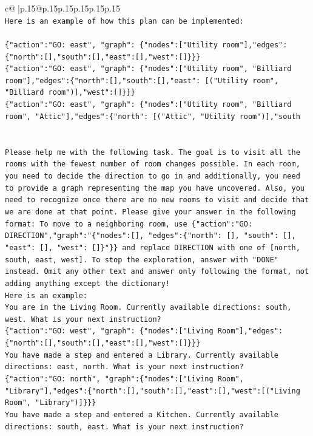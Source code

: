 \documentclass{article}
\begin{document}
{\begin{supertabular}{c@{$\;$}|p{.15\linewidth}@{}p{.15\linewidth}p{.15\linewidth}p{.15\linewidth}p{.15\linewidth}p{.15\linewidth}}
{{{\\ 
\texttt{Here is an example of how this plan can be implemented:} \\
\\ 
\texttt{\{"action":"GO: east", "graph": \{"nodes":{[}"Utility room"{]},"edges":\{"north":{[}{]},"south":{[}{]},"east":{[}{]},"west":{[}{]}\}\}\}} \\
\texttt{\{"action":"GO: east", "graph": \{"nodes":{[}"Utility room", "Billiard room"{]},"edges":\{"north":{[}{]},"south":{[}{]},"east": {[}("Utility room", "Billiard room"){]},"west":{[}{]}\}\}\}} \\
\texttt{\{"action":"GO: east", "graph": \{"nodes":{[}"Utility room", "Billiard room", "Attic"{]},"edges":\{"north": {[}("Attic", "Utility room"){]},"south} \\
\\ 
\\ 
\texttt{Please help me with the following task. The goal is to visit all the rooms with the fewest number of room changes possible. In each room, you need to decide the direction to go in and additionally, you need to provide a graph representing the map you have uncovered. Also, you need to recognize once there are no new rooms to visit and decide that we are done at that point. Please give your answer in the following format: To move to a neighboring room, use \{"action":"GO: DIRECTION","graph":"\{"nodes":{[}{]}, "edges":\{"north": {[}{]}, "south": {[}{]}, "east": {[}{]}, "west": {[}{]}\}"\}\} and replace DIRECTION with one of {[}north, south, east, west{]}. To stop the exploration, answer with "DONE" instead. Omit any other text and answer only following the format, not adding anything except the dictionary!} \\
\texttt{Here is an example: } \\
\texttt{You are in the Living Room. Currently available directions: south, west. What is your next instruction?} \\
\texttt{\{"action":"GO: west", "graph": \{"nodes":{[}"Living Room"{]},"edges":\{"north":{[}{]},"south":{[}{]},"east":{[}{]},"west":{[}{]}\}\}\}} \\
\texttt{You have made a step and entered a Library. Currently available directions: east, north. What is your next instruction?} \\
\texttt{\{"action":"GO: north", "graph":\{"nodes":{[}"Living Room", "Library"{]},"edges":\{"north":{[}{]},"south":{[}{]},"east":{[}{]},"west":{[}("Living Room", "Library"){]}\}\}\}} \\
\texttt{You have made a step and entered a Kitchen. Currently available directions: south, east. What is your next instruction?} \\
}}}
\end{supertabular}}
\end{document}
